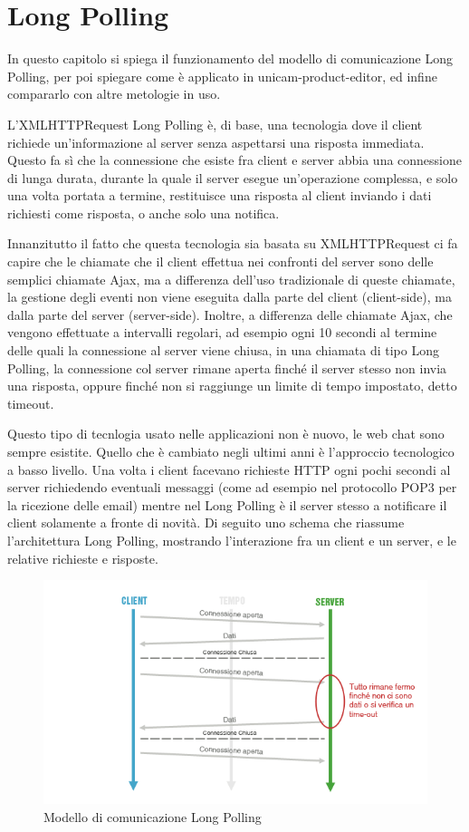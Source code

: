 \chapter{Long Polling}
\label{chap:long_polling}
In questo capitolo si spiega il funzionamento del modello di comunicazione Long Polling, per poi spiegare come è applicato in unicam-product-editor, ed infine compararlo con altre metologie in uso.

L'XMLHTTPRequest Long Polling è, di base, una tecnologia dove il client richiede un'informazione al server senza aspettarsi una risposta immediata.
Questo fa sì che la connessione che esiste fra client e server abbia una connessione di lunga durata, durante la quale il server esegue un'operazione complessa, e solo una volta portata a termine, restituisce una risposta al client inviando i dati richiesti come risposta, o anche solo una notifica.

Innanzitutto il fatto che questa tecnologia sia basata su XMLHTTPRequest ci fa capire che le chiamate che il client effettua nei confronti del server sono delle semplici chiamate Ajax, ma a differenza dell'uso tradizionale di queste chiamate, la gestione degli eventi non viene eseguita dalla parte del client (client-side), ma dalla parte del server (server-side).
Inoltre, a differenza delle chiamate Ajax, che vengono effettuate a intervalli regolari, ad esempio ogni 10 secondi al termine delle quali la connessione al server viene chiusa, in una chiamata di tipo Long Polling, la connessione col server rimane aperta finché il server stesso non invia una risposta, oppure finché non si raggiunge un limite di tempo impostato, detto timeout.

Questo tipo di tecnlogia usato nelle applicazioni non è nuovo, le web chat sono sempre esistite. Quello che è cambiato negli ultimi anni è l’approccio tecnologico a basso livello. Una volta i client facevano richieste HTTP ogni pochi secondi al server richiedendo eventuali messaggi (come ad esempio nel protocollo POP3 per la ricezione delle email) mentre nel Long Polling è il server stesso a notificare il client solamente a fronte di novità.
\newpage
Di seguito uno schema che riassume l'architettura Long Polling, mostrando l'interazione fra un client e un server, e le relative richieste e risposte.
\begin{figure}[h]
	\centering
	\includegraphics[scale=0.7]{Immagini/long_polling.png}
	\caption{Modello di comunicazione Long Polling}
\end{figure}

